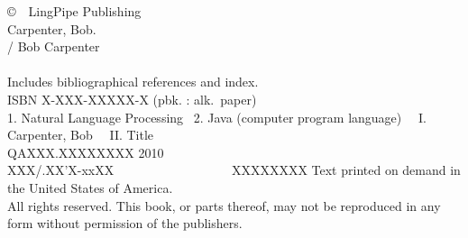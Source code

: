 \clearpage
\pagestyle{empty}
\vspace*{1.25in}
\noindent
{\footnotesize%
\copyright \ \ LingPipe Publishing
\hfill
\vfill
\vfill
{}
\\[6pt]
Carpenter, Bob.
\\
\hspace*{0.125in}{\it Text Analysis with LingPipe 4.0} / Bob Carpenter
\\
\hspace*{.5in}{p. cm.}
\\
\hspace*{0.125in}Includes bibliographical references and index.
\\
\hspace*{0.125in}ISBN X-XXX-XXXXX-X (pbk. : alk.~paper)
\\[4pt]
1. Natural Language Processing  \ 2. Java (computer program language) \ \ I. Carpenter, Bob \ \ II. Title
\\[2pt]
\hspace*{0.125in}QAXXX.XXXXXXXX 2010
\\[2pt]
\hspace*{0.125in}XXX/.XX'X-xxXX      \ \ \ \ \ \ \ \ \ \ \ \ \ \ \ \ \  \ XXXXXXXX
\vfill
\noindent
Text printed on demand in the United States of America.
\\[12pt]
All rights reserved. This book, or parts thereof, may not
be reproduced in any form without permission of the publishers.
}

